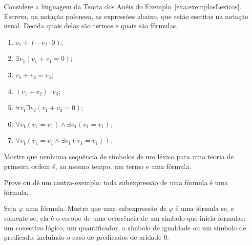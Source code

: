 \begin{exercise}\label{exr:aneisNotacaoPolonesa}
    Considere a linguagem da Teoria dos Anéis do Exemplo~\ref{exa:exemplosLexicos}.
    Escreva, na notação polonesa, as expressões abaixo, que estão escritas na notação usual.
    Decida quais delas são termos e quais são fórmulas.
    \begin{enumerate}[label=(\roman*)]
        \item $v_1 + (-v_2 \cdot 0)$;
        \item $\exists v_1 (v_1 + v_1 = 0)$;
        \item $v_1 + v_2 = v_3$;
        \item $(v_1 + v_2)\cdot v_3$;
        \item $\forall v_1 \exists v_2 (v_1 + v_2 = 0)$;
        \item $\forall v_1 (v_1 = v_1) \wedge \exists v_1 (v_1 = v_1)$;
        \item $\forall v_1 (v_1 = v_1 \wedge \exists v_1 (v_1 = v_1))$.
    \end{enumerate}
\end{exercise}

\begin{exercise}\label{exr:expressaoNaoPodeSerTermoEFormula}
    Mostre que nenhuma sequência de símbolos de um léxico para uma teoria de primeira ordem é, ao mesmo tempo, um termo e uma fórmula.
\end{exercise}

\begin{exercise}\label{exr:subexpressaoDeFormula}
    Prove ou dê um contra-exemplo: toda subexpressão de uma fórmula é uma fórmula.
\end{exercise}
\begin{exercise}\label{exr:subexpressoesDeFormula}
    Seja $\varphi$ uma fórmula.
    Mostre que uma subexpressão de $\varphi$ é uma fórmula se, e somente se, ela é o escopo de uma ocorrência de um símbolo que inicia fórmulas: um conectivo lógico, um quantificador, o símbolo de igualdade ou um símbolo de predicado, incluindo o caso de predicados de aridade $0$.
\end{exercise}
